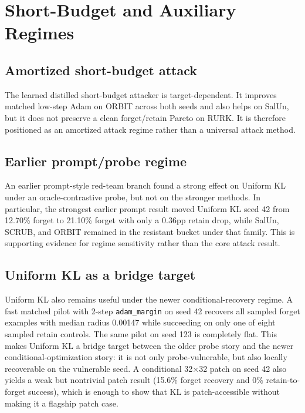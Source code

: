\documentclass[11pt]{article}
\begin{document}




\section{Short-Budget and Auxiliary Regimes}
\subsection{Amortized short-budget attack}
The learned distilled short-budget attacker is target-dependent. It improves matched low-step Adam on ORBIT across both seeds and also helps on SalUn, but it does not preserve a clean forget/retain Pareto on RURK. It is therefore positioned as an amortized attack regime rather than a universal attack method.



\subsection{Earlier prompt/probe regime}
An earlier prompt-style red-team branch found a strong effect on Uniform KL under an oracle-contrastive probe, but not on the stronger methods. In particular, the strongest earlier prompt result moved Uniform KL seed 42 from 12.70\% forget to 21.10\% forget with only a 0.36pp retain drop, while SalUn, SCRUB, and ORBIT remained in the resistant bucket under that family. This is supporting evidence for regime sensitivity rather than the core attack result.

\subsection{Uniform KL as a bridge target}
Uniform KL also remains useful under the newer conditional-recovery regime. A fast matched pilot with 2-step \texttt{adam\_margin} on seed 42 recovers all sampled forget examples with median radius 0.00147 while succeeding on only one of eight sampled retain controls. The same pilot on seed 123 is completely flat. This makes Uniform KL a bridge target between the older probe story and the newer conditional-optimization story: it is not only probe-vulnerable, but also locally recoverable on the vulnerable seed. A conditional 32$\times$32 patch on seed 42 also yields a weak but nontrivial patch result (15.6\% forget recovery and 0\% retain-to-forget success), which is enough to show that KL is patch-accessible without making it a flagship patch case.
\end{document}
